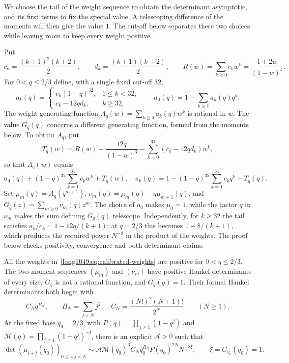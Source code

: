 \documentclass[11pt]{article}
\begin{document}
We choose the tail of the weight sequence to obtain the determinant
asymptotic, and its first terms to fix the special value. A telescoping
difference of the moments will then give the value $1$. The cut-off
below separates these two choices while leaving room to keep every
weight positive.

Put
\[
 c_k=\frac{(k+1)^2(k+2)}2,\qquad
 d_k=\frac{(k+1)(k+2)}2,\qquad
 R(w)=\sum_{k\ge0}c_kw^k=\frac{1+2w}{(1-w)^4}.
\]
For $0<q\le2/3$ define, with a single fixed cut-off $32$,
\begin{equation}\label{long1049:eq:calibrated-weights}
 a_k(q)=\begin{cases}
 c_k(1-q)^{32},&1\le k<32,\\
 c_k-12q d_k,&k\ge32,
 \end{cases}
 \qquad a_0(q)=1-\sum_{k\ge1}a_k(q)q^k.
\end{equation}
The weight generating function $A_q(w)=\sum_{k\ge0}a_k(q)w^k$
is rational in $w$. The value $G_q(q)$ concerns a different
generating function, formed from the moments below. To obtain $A_q$, put
\[
 T_q(w)=R(w)-\frac{12q}{(1-w)^3}
            -\sum_{k=0}^{31}(c_k-12qd_k)w^k,
\]
so that $A_q(w)$ equals
\[
 a_0(q)+(1-q)^{32}\sum_{k=1}^{31}c_kw^k+T_q(w),\quad
 a_0(q)=1-(1-q)^{32}\sum_{k=1}^{31}c_kq^k-T_q(q).
\]
Set $\mu_m(q)=A_q(q^{m+1})$, $\nu_m(q)=\mu_m(q)-q\mu_{m+1}(q)$,
and $G_q(z)=\sum_{m\ge0}\nu_m(q)z^m$.
The choice of $a_0$ makes $\mu_0=1$, while the factor $q$ in
$\nu_m$ makes the sum defining $G_q(q)$ telescope. Independently,
for $k\ge32$ the tail satisfies $a_k/c_k=1-12q/(k+1)$;
at $q=2/3$ this becomes $1-8/(k+1)$, which produces the required
power $N^{-8}$ in the product of the weights. The proof below checks
positivity, convergence and both determinant claims.

\begin{remark}
\label{long1049:thm:calibrated-model}
All the weights in~\eqref{long1049:eq:calibrated-weights} are positive
for $0<q\le2/3$. The two moment sequences $(\mu_m)$ and $(\nu_m)$
have positive Hankel determinants of every size, $G_q$ is not a rational
function, and
$G_q(q)=1$.  Their formal Hankel determinants both begin with
\[
 C_Nq^{B_N},\qquad B_N=\sum_{j<N}j^2,\quad
 C_N=\frac{(N!)^2(N+1)!}{2^N}\qquad(N\ge1).
\]
At the fixed base $q_0=2/3$, with
$P(q)=\prod_{j\ge1}(1-q^j)$ and
$\mathcal M(q)=\prod_{j\ge1}(1-q^j)^{-j}$,
there is an explicit $\mathcal A>0$ such that
\[
 \det(\mu_{i+j}(q_0))_{0\le i,j<N}
 \sim\mathcal A\mathcal M(q_0)^3 C_Nq_0^{B_N}
             P(q_0)^{2N}N^{-8\xi},\qquad \xi=G_{q_0}(q_0)=1.
\]
\end{remark}
\end{document}
